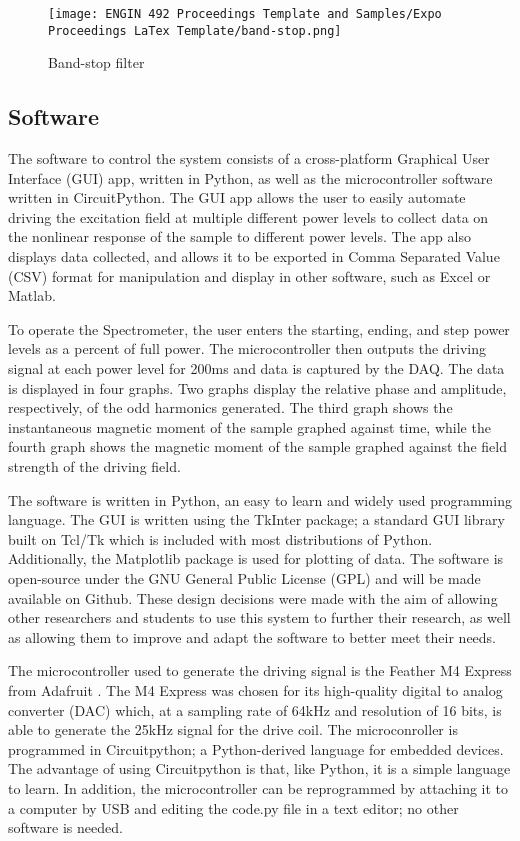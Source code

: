 \documentclass[fleqn,10pt]{document} %
\begin{document}
\begin{figure}[ht]\centering
    \texttt{[image: ENGIN 492 Proceedings Template and Samples/Expo Proceedings LaTex Template/band-stop.png]}
    \caption{Band-stop filter}
    \label{fig:filters bandstop}
\end{figure}

	\subsection{Software}
	The software to control the system consists of a cross-platform Graphical User Interface (GUI) app, written in Python, as well as the microcontroller software written in CircuitPython. The GUI app allows the user to easily automate driving the excitation field at multiple different power levels to collect data on the nonlinear response of the sample to different power levels. The app also displays data collected, and allows it to be exported in Comma Separated Value (CSV) format for manipulation and display in other software, such as Excel or Matlab.
	
	To operate the Spectrometer, the user enters the starting, ending, and step power levels as a percent of full power. The microcontroller then outputs the driving signal at each power level for 200ms and data is captured by the DAQ. The data is displayed in four graphs. Two graphs display the relative phase and amplitude, respectively, of the odd harmonics generated. The third graph shows the instantaneous magnetic moment of the sample graphed against time, while the fourth graph shows the magnetic moment of the sample graphed against the field strength of the driving field.
	
	The software is written in Python, an easy to learn and widely used programming language. The GUI is written using the TkInter package; a standard GUI library built on Tcl/Tk which is included with most distributions of Python. Additionally, the Matplotlib package is used for plotting of data. The software is open-source under the GNU General Public License (GPL) and will be made available on Github. These design decisions were made with the aim of allowing other researchers and students to use this system to further their research, as well as allowing them to improve and adapt the software to better meet their needs.
	
	The microcontroller used to generate the driving signal is the Feather M4 Express from Adafruit \cite{p14}. The M4 Express was chosen for its high-quality digital to analog converter (DAC) which, at a sampling rate of 64kHz and resolution of 16 bits, is able to generate the 25kHz signal for the drive coil. The microconroller is programmed in Circuitpython; a Python-derived language for embedded devices. The advantage of using Circuitpython is that, like Python, it is a simple language to learn. In addition, the microcontroller can be reprogrammed by attaching it to a computer by USB and editing the code.py file in a text editor; no other software is needed.
	
\end{document}
